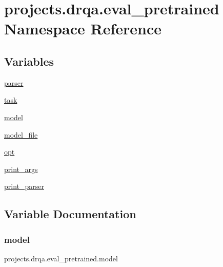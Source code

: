 \hypertarget{namespaceprojects_1_1drqa_1_1eval__pretrained}{}\section{projects.\+drqa.\+eval\+\_\+pretrained Namespace Reference}
\label{namespaceprojects_1_1drqa_1_1eval__pretrained}
\subsection*{Variables}
\begin{DoxyCompactItemize}
\item 
\hyperlink{namespaceprojects_1_1drqa_1_1eval__pretrained_a37675240be4a773ee4829182e7c26f74}{parser}
\item 
\hyperlink{namespaceprojects_1_1drqa_1_1eval__pretrained_af546af874d2aec2dc8fa6acc80d0bdad}{task}
\item 
\hyperlink{namespaceprojects_1_1drqa_1_1eval__pretrained_ac17d62ebe678c501feaeea4fba395d77}{model}
\item 
\hyperlink{namespaceprojects_1_1drqa_1_1eval__pretrained_ac70db4d56b0ba5d6f2ebbd7edfe54b58}{model\+\_\+file}
\item 
\hyperlink{namespaceprojects_1_1drqa_1_1eval__pretrained_ae8d8e4f7e660780380ee0e5c3b73c02a}{opt}
\item 
\hyperlink{namespaceprojects_1_1drqa_1_1eval__pretrained_a8530e9ddfd2e23f7f9d70864fd1b6c2c}{print\+\_\+args}
\item 
\hyperlink{namespaceprojects_1_1drqa_1_1eval__pretrained_a3d2f1d2e6627a7c2e64a604ee822cb27}{print\+\_\+parser}
\end{DoxyCompactItemize}


\subsection{Variable Documentation}
\mbox{\label{namespaceprojects_1_1drqa_1_1eval__pretrained_ac17d62ebe678c501feaeea4fba395d77}} 
\subsubsection{\texorpdfstring{model}{model}}
{\footnotesize\ttfamily projects.\+drqa.\+eval\+\_\+pretrained.\+model}



